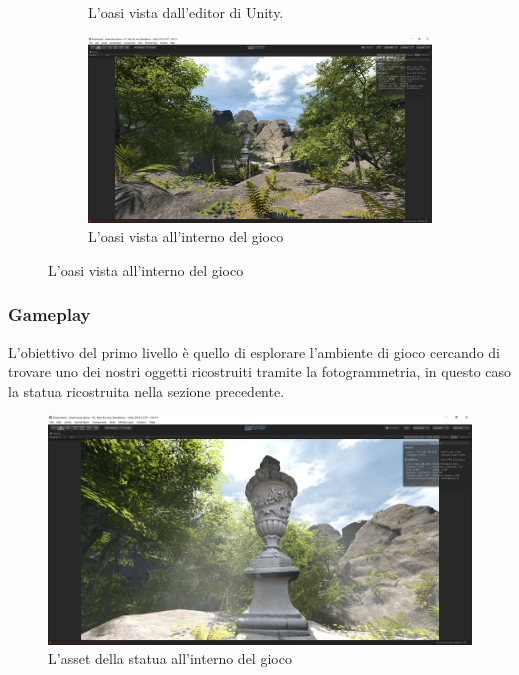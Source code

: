 \documentclass[12pt]{report}
\begin{document}
\begin{figure}[H]
\begin{subfigure}[b]{0.45\linewidth}
    \captionsetup{justification=centering}
    \caption{L'oasi vista dall'editor di Unity.}
  \end{subfigure}
  \begin{subfigure}[b]{0.45\linewidth}
    \centering
    \includegraphics[width=\linewidth]{img/dreamsand-ingame-statue.png}
    \captionsetup{justification=centering}
    \caption{L'oasi vista all'interno del gioco}
  \end{subfigure}
\end{figure}

\subsubsection*{Gameplay}
L'obiettivo del primo livello è quello di esplorare l'ambiente di gioco cercando di trovare uno dei nostri oggetti ricostruiti tramite la fotogrammetria, in questo caso la statua ricostruita nella sezione precedente.

\begin{figure}[H]
    \centering
    \includegraphics[width = \linewidth]{img/dreamsand-ingame-statue-close.png}
    \caption{L'asset della statua all'interno del gioco}
\end{figure}
\end{document}
